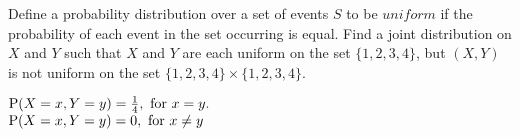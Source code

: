 \question Define a probability distribution over a set of events $S$ to be $\textit{uniform}$ if the probability of each event in the set occurring is equal. Find a joint distribution on $X$ and $Y$ such that $X$ and $Y$ are each uniform on the set $\{1,2,3,4\}$, but $(X,Y)$ is not uniform on the set $\{1,2,3,4\} \times \{ 1,2,3,4 \}$.\\

\begin{solution}[.75 cm]
$\P(X = x, Y = y) = \frac{1}{4}, \text{ for }x=y.$\\ 
$\P(X = x, Y = y) = 0, \text{ for }x\neq y$
\end{solution}